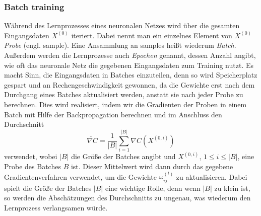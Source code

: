 \subsubsection{Batch training}
Während des Lernprozesses eines neuronalen Netzes wird über die gesamten Eingangsdaten $X^{(0)}$ iteriert. Dabei nennt
man ein einzelnes Element von $X^{(0)}$ \textit{Probe} (engl. sample). Eine Ansammlung an samples heißt wiederum
\textit{Batch}. Außerdem werden die Lernprozesse auch \textit{Epochen} genannt, dessen Anzahl angibt, wie oft das
neuronale Netz die gegebenen Eingangsdaten zum Training nutzt. Es macht Sinn, die Eingangsdaten in Batches einzuteilen,
denn so wird Speicherplatz gespart und an Rechengeschwindigkeit gewonnen, da die Gewichte erst nach dem Durchgang eines
Batches aktualisiert werden, anstatt sie nach jeder Probe zu berechnen. Dies wird realisiert, indem wir die Gradienten
der Proben in einem Batch mit Hilfe der Backpropagation berechnen und im Anschluss den Durchschnitt
\[
    \tilde{\nabla C} = \frac{1}{|B|} \sum_{i=1}^{|B|} \nabla C(X^{(0,i)})
\]
verwendet, wobei $|B|$ die Größe der Batches angibt und $X^{(0,i)}$, $1 \leq i \leq |B|$, eine Probe des Batches $B$ ist.
Dieser Mittelwert wird dann durch das gegebene Gradientenverfahren verwendet, um die Gewichte $\omega_{ij}^{(l)}$ zu
aktualisieren. Dabei spielt die Größe der Batches $|B|$ eine wichtige Rolle, denn wenn $|B|$ zu klein ist, so werden die
Abschätzungen des Durchschnitts zu ungenau, was wiederum den Lernprozess verlangsamen würde.

